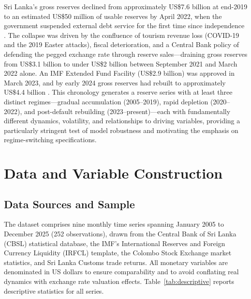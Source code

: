 \documentclass[12pt,a4paper]{article}
\begin{document}
Sri Lanka's gross reserves declined from approximately US\$7.6 billion at end-2019 to an estimated US\$50 million of usable reserves by April 2022, when the government suspended external debt service for the first time since independence \citep{Athukorala2024}. The collapse was driven by the confluence of tourism revenue loss (COVID-19 and the 2019 Easter attacks), fiscal deterioration, and a Central Bank policy of defending the pegged exchange rate through reserve sales---draining gross reserves from US\$3.1 billion to under US\$2 billion between September 2021 and March 2022 alone. An IMF Extended Fund Facility (US\$2.9 billion) was approved in March 2023, and by early 2024 gross reserves had rebuilt to approximately US\$4.4 billion \citep{Weerakoon2023,UNDP2022}. This chronology generates a reserve series with at least three distinct regimes---gradual accumulation (2005--2019), rapid depletion (2020--2022), and post-default rebuilding (2023--present)---each with fundamentally different dynamics, volatility, and relationships to driving variables, providing a particularly stringent test of model robustness and motivating the emphasis on regime-switching specifications.

\section{Data and Variable Construction}

\subsection{Data Sources and Sample}

The dataset comprises nine monthly time series spanning January 2005 to December 2025 (252 observations), drawn from the Central Bank of Sri Lanka (CBSL) statistical database, the IMF's International Reserves and Foreign Currency Liquidity (IRFCL) template, the Colombo Stock Exchange market statistics, and Sri Lanka Customs trade returns. All monetary variables are denominated in US dollars to ensure comparability and to avoid conflating real dynamics with exchange rate valuation effects. Table~\ref{tab:descriptive} reports descriptive statistics for all series.
\end{document}
